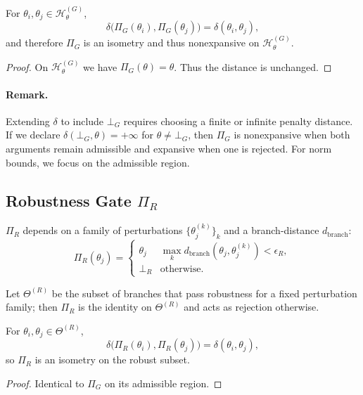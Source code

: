 \documentclass[11pt, a4paper]{article}
\begin{document}
\begin{proposition}
For $\theta_i,\theta_j \in \mathcal{H}_\theta^{(G)}$,
\[
\delta\bigl(\Pi_G(\theta_i),\Pi_G(\theta_j)\bigr)
=
\delta(\theta_i,\theta_j),
\]
and therefore $\Pi_G$ is an isometry and thus nonexpansive on $\mathcal{H}_\theta^{(G)}$.
\end{proposition}

\begin{proof}
On $\mathcal{H}_\theta^{(G)}$ we have $\Pi_G(\theta)=\theta$.
Thus the distance is unchanged.
\end{proof}

\paragraph{Remark.}
Extending $\delta$ to include $\bot_G$ requires choosing a finite or infinite penalty distance.
If we declare $\delta(\bot_G, \theta) = +\infty$ for $\theta\neq\bot_G$, then $\Pi_G$ is nonexpansive when both arguments remain admissible and expansive when one is rejected.
For norm bounds, we focus on the admissible region.

\subsection{Robustness Gate $\Pi_R$}

$\Pi_R$ depends on a family of perturbations $\{\theta_j^{(k)}\}_{k}$ and a branch-distance $d_{\mathrm{branch}}$:
\[
\Pi_R(\theta_j) =
\begin{cases}
\theta_j & \max_k d_{\mathrm{branch}}(\theta_j,\theta_j^{(k)}) < \epsilon_R,\\[2pt]
\bot_R   & \text{otherwise.}
\end{cases}
\]

Let $\Theta^{(R)}$ be the subset of branches that pass robustness for a fixed perturbation family; then $\Pi_R$ is the identity on $\Theta^{(R)}$ and acts as rejection otherwise.

\begin{proposition}
For $\theta_i,\theta_j \in \Theta^{(R)}$,
\[
\delta\bigl(\Pi_R(\theta_i),\Pi_R(\theta_j)\bigr)
=
\delta(\theta_i,\theta_j),
\]
so $\Pi_R$ is an isometry on the robust subset.
\end{proposition}

\begin{proof}
Identical to $\Pi_G$ on its admissible region.
\end{proof}
\end{document}
